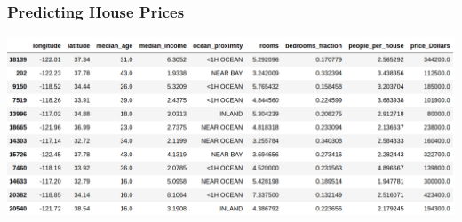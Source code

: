 \documentclass[xcolor=table]{beamer}
\begin{document}
\begin{frame}[t]
\frametitle{Predicting House Prices}
\begin{center}
    \includegraphics[scale=0.2]{housing_data.png}
\end{center}
\end{frame}
\end{document}
